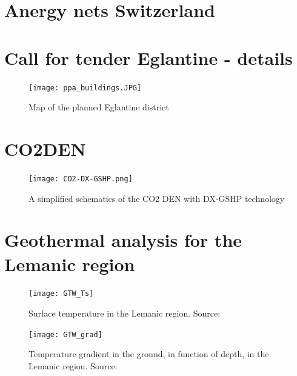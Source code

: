 \section{Anergy nets Switzerland}
\label{as:anergy_suisse}


\clearpage
\newpage
\section{Call for tender Eglantine - details}
\label{as:eglantine}



\begin{figure}[htp]
	\centering
	\texttt{[image: ppa\_buildings.JPG]}
	\caption{Map of the planned Eglantine district}
	\label{fig:ppa_buildings}
\end{figure}
\clearpage
\newpage
\section{CO2DEN}\label{as:co2den}
\begin{figure}[htp]
	\centering
	\texttt{[image: CO2-DX-GSHP.png]}
	\caption{A simplified schematics of the CO2 DEN with DX-GSHP technology}
	\label{fig:co2_gshp}
\end{figure}
\clearpage
\newpage
\section{Geothermal analysis for the Lemanic region} \label{as:gt}
\begin{figure}[tph]
	\centering
	\texttt{[image: GTW\_Ts]}
	\caption{Surface temperature in the Lemanic region. Source:~\cite{gadzEvaluationPotentielGeothermique2011}}
	\label{fig:gtwts}
\end{figure}
\begin{figure}[tph]
	\centering
	\texttt{[image: GTW\_grad]}
	\caption{Temperature gradient in the ground, in function of depth, in the Lemanic region. Source: ~\cite{gadzEvaluationPotentielGeothermique2011}}
	\label{fig:gtwgrad}
\end{figure}

\clearpage
\newpage
